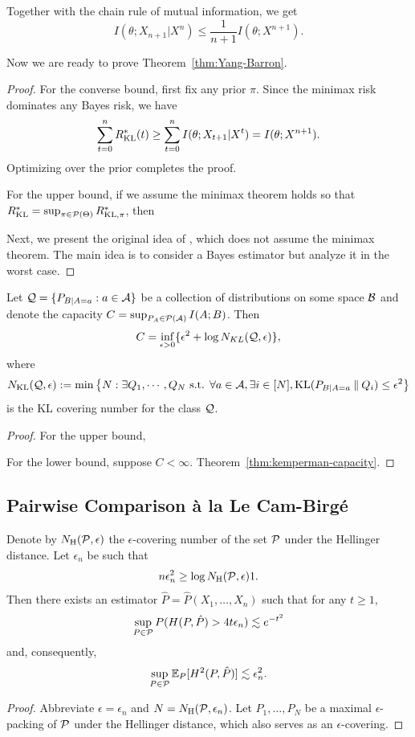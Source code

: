 Together with the chain rule of mutual information, we get
$$I(\theta;X_{n+1}|X^n)\leq \frac{1}{n+1}I(\theta;X^{n+1}).$$

Now we are ready to prove Theorem~\ref{thm:Yang-Barron}.
\begin{proof}
    For the converse bound, first fix any prior $\pi$. Since the minimax risk dominates any Bayes risk, we have
    \begin{align*}
        \sum_{t=0}^{n}R^*_{\operatorname{KL}}(t)\geq \sum_{t=0}^{n}I(\theta;X_{t+1}|X^t)=I(\theta;X^{n+1}).
    \end{align*}    
    Optimizing over the prior completes the proof.

    For the upper bound, if we assume the minimax theorem holds so that $R^*_{\operatorname{KL}}=\sup_{\pi\in\mathcal{P}(\Theta)}R^*_{\operatorname{KL},\pi}$,
    then 

    Next, we present the original idea of \citet{yang1999information}, which does not assume the minimax theorem.
    The main idea is to consider a Bayes estimator but analyze it in the worst case.
\end{proof}

\begin{theorem}
    Let $\mathcal{Q}=\{P_{B|A=a}:a\in\mathcal{A}\}$ be a collection of distributions on some space $\mathcal{B}$ and denote the capacity $C=\sup_{P_A\in\mathcal{P}(\mathcal{A})}I(A;B)$.
    Then 
    \[C=\inf_{\epsilon>0}\{\epsilon^2+\log N_{KL}(\mathcal{Q},\epsilon)\},\]
    where 
    \[N_{\operatorname{KL}}(\mathcal{Q},\epsilon):=\min\left\{N:\exists Q_1,\cdots,Q_N \text{ s.t. }\forall a\in\mathcal{A},\exists i\in [N],\operatorname{KL}(P_{B|A=a}\mathbin{\|} Q_i)\leq\epsilon^2\right\}\]
    is the KL covering number for the class $\mathcal{Q}$.
\end{theorem}
\begin{proof}
    For the upper bound,

    For the lower bound, suppose $C<\infty$. Theorem~\ref{thm:kemperman-capacity}.
\end{proof}



\subsection{Pairwise Comparison \`{a} la Le Cam-Birg\'{e}}

\begin{theorem}
    Denote by $N_{\rm H}(\mathcal{P},\epsilon)$ the $\epsilon$-covering number of the set $\mathcal{P}$ under the Hellinger distance.
    Let $\epsilon_n$ be such that 
    \[n\epsilon_n^2\geq \log N_{\rm H}(\mathcal{P},\epsilon) 1.\]
    Then there exists an estimator $\hat{P}=\hat{P}(X_1,\dots,X_n)$ such that for any $t\geq 1$,
    \[\sup_{P\in\mathcal{P}}P(H(P,\hat{P})>4t\epsilon_n)\lesssim e^{-t^2}\]
    and, consequently, 
    \[\sup_{P\in\mathcal{P}}\mathbb{E}_P[H^2(P,\hat P)]\lesssim \epsilon_n^2.\]
\end{theorem}
\begin{proof}
    Abbreviate $\epsilon=\epsilon_n$ and $N=N_{\rm H}(\mathcal{P},\epsilon_n)$.
    Let $P_1,\dots,P_N$ be a maximal $\epsilon$-packing of $\mathcal{P}$ under the Hellinger distance, which also serves as an $\epsilon$-covering.
\end{proof}


